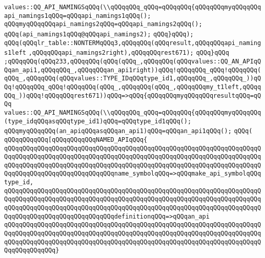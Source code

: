 \verb|values::QQ_API_NAMINGSqQQq(\\qQQqqQQq_qQQq=qQQqqQQq{qQQqqQQqmyqQQqqQQqapi_namings1qQQq=qQQqapi_namings1qQQq();|\newline
\verb|qQQqmyqQQqqQQqapi_namings2qQQq=qQQqapi_namings2qQQq();|\newline
\verb|qQQq(api_namings1qQQq@qQQqapi_namings2);|\newline
\verb|qQQq}qQQq);|\newline
\verb|qQQq(qQQqlr_table::NONTERMqQQq3,qQQqqQQq(qQQqresult,qQQqqQQqapi_namings1left|\newline
\verb|,qQQqqQQqapi_namings2right),qQQqqQQqrest671);|\newline
\verb|qQQq}qQQq|\newline
\verb|;qQQqqQQq(qQQq233,qQQqqQQq(qQQq(qQQq_,qQQqqQQq(qQQqvalues::QQ_AN_APIqQQqan_api1,qQQqqQQq_,qQQqqQQqan_api1right))qQQq!qQQqqQQq_qQQq!qQQqqQQq(qQQq_,qQQqqQQq(qQQqvalues::TYPE_IDqQQqtype_id1,qQQqqQQq_,qQQqqQQq_))qQQq!qQQqqQQq_qQQq!qQQqqQQq(qQQq_,qQQqqQQq(qQQq_,qQQqqQQqmy_t1left,qQQqqQQq_))qQQq!qQQqqQQqrest671))qQQq=>qQQq{qQQqqQQqmyqQQqqQQqresultqQQq=qQQq|\newline
\verb|values::QQ_API_NAMINGSqQQq(\\qQQqqQQq_qQQq=qQQqqQQq{qQQqqQQqmyqQQqqQQq(type_idqQQqasqQQqtype_id1)qQQq=qQQqtype_id1qQQq();|\newline
\verb|qQQqmyqQQqqQQq(an_apiqQQqasqQQqan_api1)qQQq=qQQqan_api1qQQq();|\newline
\verb|qQQq(|\newline
\verb|qQQqqQQqqQQq[qQQqqQQqqQQqNAMED_APIqQQq{|\newline
\verb|qQQqqQQqqQQqqQQqqQQqqQQqqQQqqQQqqQQqqQQqqQQqqQQqqQQqqQQqqQQqqQQqqQQqqQQqqQQqqQQqqQQqqQQqqQQqqQQqqQQqqQQqqQQqqQQqqQQqqQQqqQQqqQQqqQQqqQQqqQQqqQQqqQQqqQQqqQQqqQQqqQQqqQQqqQQqqQQqqQQqqQQqqQQqqQQqqQQqqQQqqQQqqQQqqQQqqQQqqQQqqQQqqQQqqQQqqQQqqQQqname_symbolqQQq=>qQQqmake_api_symbolqQQqtype_id,|\newline
\verb|qQQqqQQqqQQqqQQqqQQqqQQqqQQqqQQqqQQqqQQqqQQqqQQqqQQqqQQqqQQqqQQqqQQqqQQqqQQqqQQqqQQqqQQqqQQqqQQqqQQqqQQqqQQqqQQqqQQqqQQqqQQqqQQqqQQqqQQqqQQqqQQqqQQqqQQqqQQqqQQqqQQqqQQqqQQqqQQqqQQqqQQqqQQqqQQqqQQqqQQqqQQqqQQqqQQqqQQqqQQqqQQqqQQqqQQqqQQqqQQqdefinitionqQQq=>qQQqan_api|\newline
\verb|qQQqqQQqqQQqqQQqqQQqqQQqqQQqqQQqqQQqqQQqqQQqqQQqqQQqqQQqqQQqqQQqqQQqqQQqqQQqqQQqqQQqqQQqqQQqqQQqqQQqqQQqqQQqqQQqqQQqqQQqqQQqqQQqqQQqqQQqqQQqqQQqqQQqqQQqqQQqqQQqqQQqqQQqqQQqqQQqqQQqqQQqqQQqqQQqqQQqqQQqqQQqqQQqqQQqqQQqqQQqqQQq}|\newline
